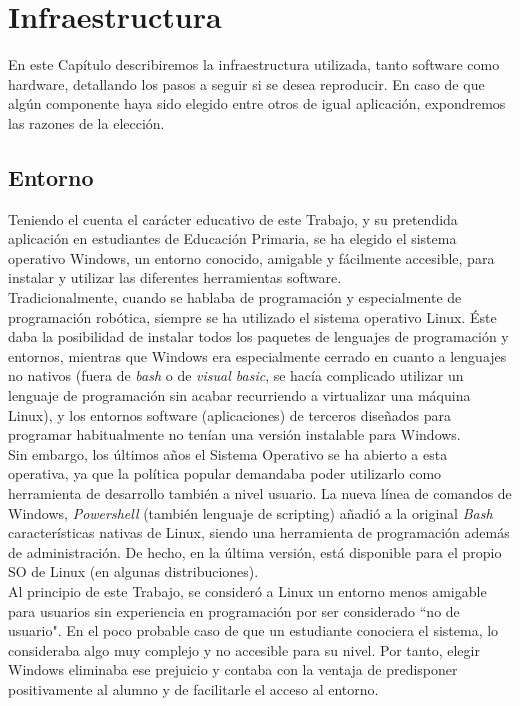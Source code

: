 \chapter{Infraestructura}
\label{cap:infra}

En este Capítulo describiremos la infraestructura utilizada, tanto software como hardware, detallando los pasos a seguir si se desea reproducir. En caso de que algún componente haya sido elegido entre otros de igual aplicación, expondremos las razones de la elección.


\section{Entorno}\label{sec:entorno}
Teniendo el cuenta el carácter educativo de este Trabajo, y su pretendida aplicación en estudiantes de Educación Primaria, se ha elegido el sistema operativo Windows, un entorno conocido, amigable y fácilmente accesible, para instalar y utilizar las diferentes herramientas software. \\
Tradicionalmente, cuando se hablaba de programación y especialmente de programación robótica, siempre se ha utilizado el sistema operativo Linux. Éste daba la posibilidad de instalar todos los paquetes de lenguajes de programación y entornos, mientras que Windows era especialmente cerrado en cuanto a lenguajes no nativos (fuera de \textit{bash} o de \textit{visual basic}, se hacía complicado utilizar un lenguaje de programación sin acabar recurriendo a virtualizar una máquina Linux), y los entornos software (aplicaciones) de terceros diseñados para programar habitualmente no tenían una versión instalable para Windows. \\
Sin embargo, los últimos años el Sistema Operativo se ha abierto a esta operativa, ya que la política popular demandaba poder utilizarlo como herramienta de desarrollo también a nivel usuario. La nueva línea de comandos de Windows, \textit{\textit{Powershell}} (también lenguaje de scripting) añadió a la original \textit{Bash} características nativas de Linux, siendo una herramienta de programación además de administración. De hecho, en la última versión, está disponible para el propio SO de Linux (en algunas distribuciones). \\
Al principio de este Trabajo, se consideró a Linux un entorno menos amigable para usuarios sin experiencia en programación por ser considerado ``no de usuario". En el poco probable caso de que un estudiante conociera el sistema, lo consideraba algo muy complejo y no accesible para su nivel. Por tanto, elegir Windows eliminaba ese prejuicio y contaba con la ventaja de predisponer positivamente al alumno y de facilitarle el acceso al entorno. 

